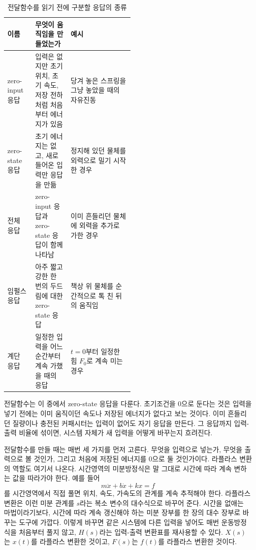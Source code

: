 \begin{table}[!htbp]
  \centering
  \caption{전달함수를 읽기 전에 구분할 응답의 종류}
  \small
  \setlength{\tabcolsep}{4pt}
  \begin{tabularx}{\linewidth}{@{}>{\raggedright\arraybackslash}p{0.22\linewidth}>{\raggedright\arraybackslash}p{0.29\linewidth}>{\raggedright\arraybackslash}X@{}}
    \toprule
    이름 & 무엇이 움직임을 만들었는가 & 예시 \\
    \midrule
    zero-input 응답 & 입력은 없지만 초기 위치, 초기 속도, 저장 전하처럼 처음부터 에너지가 있음 & 당겨 놓은 스프링을 그냥 놓았을 때의 자유진동 \\
    zero-state 응답 & 초기 에너지는 없고, 새로 들어온 입력만 응답을 만듦 & 정지해 있던 물체를 외력으로 밀기 시작한 경우 \\
    전체 응답 & zero-input 응답과 zero-state 응답이 함께 나타남 & 이미 흔들리던 물체에 외력을 추가로 가한 경우 \\
    임펄스 응답 & 아주 짧고 강한 한 번의 두드림에 대한 zero-state 응답 & 책상 위 물체를 순간적으로 톡 친 뒤의 움직임 \\
    계단 응답 & 일정한 입력을 어느 순간부터 계속 가했을 때의 응답 & $t=0$부터 일정한 힘 $F_0$로 계속 미는 경우 \\
    \bottomrule
  \end{tabularx}
\end{table}

전달함수는 이 중에서 zero-state 응답을 다룬다.
초기조건을 0으로 둔다는 것은 입력을 넣기 전에는 이미 움직이던 속도나 저장된 에너지가 없다고 보는 것이다.
이미 흔들리던 질량이나 충전된 커패시터는 입력이 없어도 자기 응답을 만든다.
그 응답까지 입력-출력 비율에 섞이면, 시스템 자체가 새 입력을 어떻게 바꾸는지 흐려진다.

전달함수를 만들 때는 매번 세 가지를 먼저 고른다.
무엇을 입력으로 넣는가, 무엇을 출력으로 볼 것인가, 그리고 처음에 저장된 에너지를 0으로 둘 것인가이다.
라플라스 변환의 역할도 여기서 나온다.
시간영역의 미분방정식은 말 그대로 시간에 따라 계속 변하는 값을 따라가야 한다.
예를 들어
\begin{equation}
  m\ddot{x}+b\dot{x}+kx=f
\end{equation}
를 시간영역에서 직접 풀면 위치, 속도, 가속도의 관계를 계속 추적해야 한다.
라플라스 변환은 이런 미분 관계를 $s$라는 복소 변수의 대수식으로 바꾸어 준다.
시간을 없애는 마법이라기보다, 시간에 따라 계속 갱신해야 하는 미분 장부를 한 장의 대수 장부로 바꾸는 도구에 가깝다.
이렇게 바꾸면 같은 시스템에 다른 입력을 넣어도 매번 운동방정식을 처음부터 풀지 않고, $H(s)$라는 입력-출력 변환표를 재사용할 수 있다.
$X(s)$는 $x(t)$를 라플라스 변환한 것이고, $F(s)$는 $f(t)$를 라플라스 변환한 것이다.

